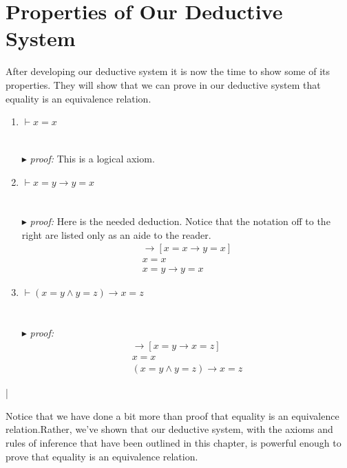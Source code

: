 \documentclass[9pt,a4paper]{article}
\newcounter{theo}
\newcommand{\proof}{\ \\ \ \\ $\blacktriangleright$ \textit{proof: }}
\begin{document}
    \section*{Properties of Our Deductive System}
        After developing our deductive system it is now the time to show some of its properties. They will show that we can prove in our deductive system that equality is an equivalence relation.
        \begin{theorem}
            \begin{enumerate}
                \item $\vdash x=x$\\
                \proof This is a logical axiom.
                \item $\vdash x=y \rightarrow y = x$\\
                \proof Here is the needed deduction. Notice that the notation off to the right are listed only as an aide to the reader.
                \begin{align}
                    [x=y \land x=x] \rightarrow [x=x\rightarrow y=x]\\
                    x = x \\
                    x = y \rightarrow y=x 
                \end{align}
                \item $\vdash (x=y \land y = z ) \rightarrow x = z$\\
                \proof 
                \begin{align}
                    [x=x\land y=z] \rightarrow [x = y \rightarrow x = z]\\
                    x=x \\
                    (x=y\land y=z)\rightarrow x=z
                \end{align}
            \end{enumerate}|
        \end{theorem}
        Notice that we have done a bit more than proof that equality is an equivalence relation.Rather, we've shown that our deductive system, with the axioms and rules of inference that have been outlined in this chapter, is powerful enough to prove that equality is an equivalence relation.
\end{document}
